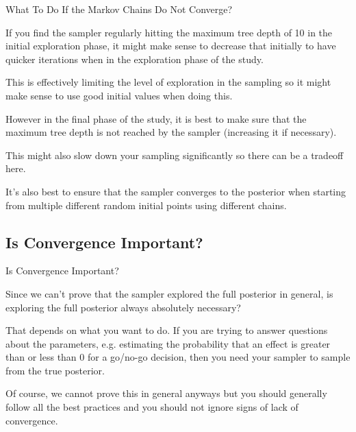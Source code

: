\begin{frame}{What To Do If the Markov Chains Do Not Converge?}
    \begin{vfilleditems}
        \item If you find the sampler regularly hitting the maximum tree depth of 10 in the initial exploration phase, it might make sense to decrease that initially to have quicker iterations when in the exploration phase of the study.
        \item This is effectively limiting the level of exploration in the sampling so it might make sense to use good initial values when doing this.
        \item However in the final phase of the study, it is best to make sure that the maximum tree depth is not reached by the sampler (increasing it if necessary).
        \item This might also slow down your sampling significantly so there can be a tradeoff here.
        \item It's also best to ensure that the sampler converges to the posterior when starting from multiple different random initial points using different chains.
    \end{vfilleditems}
\end{frame}

\subsection{Is Convergence Important?}

\begin{frame}{Is Convergence Important?}
    \begin{vfilleditems}
        \item Since we can't prove that the sampler explored the full posterior in general, is exploring the full posterior always absolutely necessary?
        \item That depends on what you want to do. If you are trying to answer questions about the parameters, e.g. estimating the probability that an effect is greater than or less than 0 for a go/no-go decision, then you need your sampler to sample from the true posterior.
        \item Of course, we cannot prove this in general anyways but you should generally follow all the best practices and you should not ignore signs of lack of convergence.
    \end{vfilleditems}
\end{frame}

